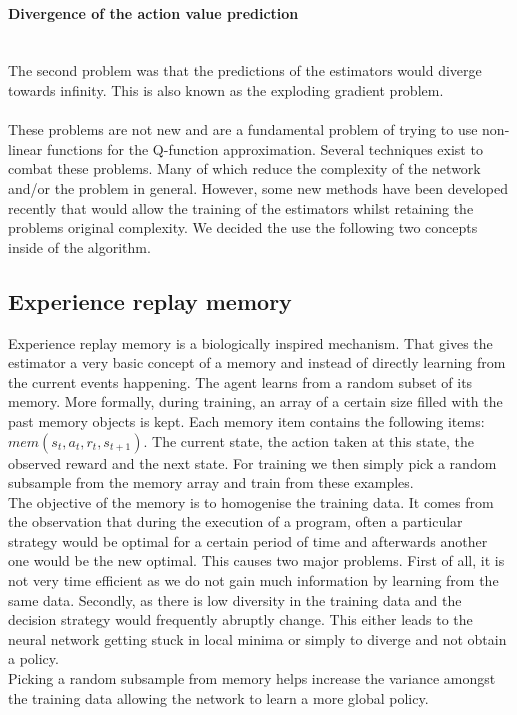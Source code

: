 \paragraph{Divergence of the action value prediction}\mbox{}\\
The second problem was that the predictions of the estimators would diverge towards infinity. This is also known as the exploding gradient problem.\\
\mbox{}\\
These problems are not new and are a fundamental problem of trying to use non-linear functions for the Q-function approximation. Several techniques exist to combat these problems. Many of which reduce the complexity of the network and/or the problem in general. However, some new methods have been developed recently that would allow the training of the estimators whilst retaining the problems original complexity. We decided the use the following two concepts inside of the algorithm.
\subsection{Experience replay memory}
Experience replay memory \cite{Mnih2015} is a biologically inspired mechanism. That gives the estimator a very basic concept of a memory and instead of directly learning from the current events happening. The agent learns from a random subset of its memory. More formally, during training, an array of a certain size filled with the past memory objects is kept. Each memory item contains the following items: $mem(s_t, a_t, r_t, s_{t+1})$. The current state, the action taken at this state, the observed reward and the next state. For training we then simply pick a random subsample from the memory array and train from these examples.
\\
The objective of the memory is to homogenise the training data. It comes from the observation that during the execution of a program, often a particular strategy would be optimal for a certain period of time and afterwards another one would be the new optimal. This causes two major problems. First of all, it is not very time efficient as we do not gain much information by learning from the same data. Secondly, as there is low diversity in the training data and the decision strategy would frequently abruptly change. This either leads to the neural network getting stuck in local minima or simply to diverge and not obtain a policy. \\
Picking a random subsample from memory helps increase the variance amongst the training data allowing the network to learn a more global policy. 

